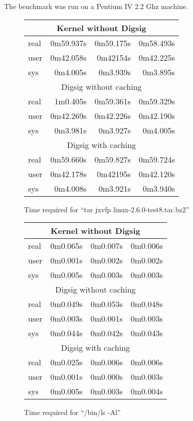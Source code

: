 \documentclass{article}
\begin{document}
The benchmark was run on a Pentium IV 2.2 Ghz machine.

\begin{figure}
\begin{center}
\begin{tabular}{|l|r|r|r|}
\hline
\multicolumn{4}{|c|}{Kernel without Digsig} \\
\hline
	real  &  0m59.937s &0m59.175s &0m58.493s \\
	user  &  0m42.058s &0m42154s &0m42.225s \\
	sys   &  0m4.005s  &0m3.939s  &0m3.895s \\
\hline
\multicolumn{4}{|c|}{Digsig without caching} \\
\hline
	real  &  1m0.405s  & 0m59.361s & 0m59.329s \\
	user  &  0m42.269s & 0m42.226s & 0m42.190s \\
	sys   &  0m3.981s  & 0m3.927s  & 0m4.005s \\
\hline
\multicolumn{4}{|c|}{Digsig with caching} \\
\hline
	real  &  0m59.660s & 0m59.827s & 0m59.724s \\
	user  &  0m42.178s & 0m42195s & 0m42.120s \\
	sys   &  0m4.008s  & 0m3.921s  & 0m3.940s \\
\hline
\end{tabular}
\caption{Time required for ``tar jxvfp linux-2.6.0-test8.tar.bz2''}
\label{fig:tartimings}
\end{center}
\end{figure}

\begin{figure}
\begin{center}
\begin{tabular}{|l|r|r|r|}
\hline
\multicolumn{4}{|c|}{Kernel without Digsig} \\
\hline
	real  &  0m0.065s &0m0.007s &0m0.006s \\
	user  &  0m0.001s &0m0.002s &0m0.002s \\
	sys   &  0m0.005s &0m0.003s &0m0.003s \\
\hline
\multicolumn{4}{|c|}{Digsig without caching} \\
\hline
	real  &  0m0.049s &0m0.053s &0m0.048s \\
	user  &  0m0.003s &0m0.001s &0m0.003s \\
	sys   &  0m0.044s &0m0.042s &0m0.043s \\
\hline
\multicolumn{4}{|c|}{Digsig with caching} \\
\hline
	real  &  0m0.025s& 0m0.006s &0m0.006s \\
	user  &  0m0.001s& 0m0.000s &0m0.003s \\
	sys   &  0m0.005s& 0m0.003s &0m0.004s \\
\hline
\end{tabular}
\caption{Time required for ``/bin/ls -Al''}
\label{fig:lstimings}
\end{center}
\end{figure}
\end{document}
